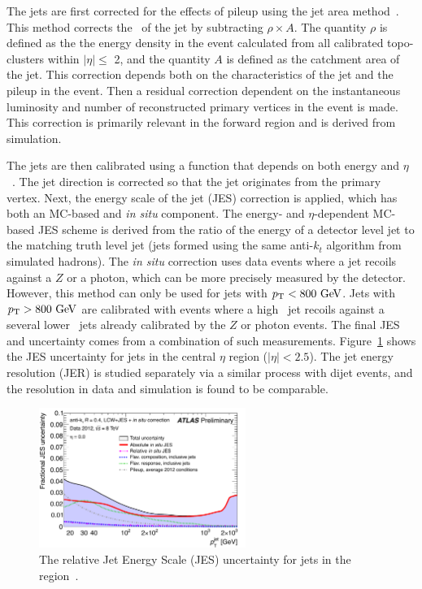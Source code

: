 The jets are first corrected for the effects of pileup using the jet area method~\cite{JES}. This method corrects the \pt\ of the jet by subtracting $\rho\times A$. The quantity $\rho$ is defined as the  the energy density in the event calculated from all calibrated topo-clusters within $|\eta|\leq$ 2, and the quantity $A$ is defined as the catchment area of the jet. This correction depends both on the characteristics of the jet and the pileup in the event. Then a residual correction dependent on the instantaneous luminosity and number of reconstructed primary vertices in the event is made. This correction is primarily relevant in the forward region and is derived from simulation.

The jets are then calibrated using a function that depends on both energy and $\eta$~\cite{JES}. The jet direction is corrected so that the jet originates from the primary vertex. Next, the energy scale of the jet (JES) correction is applied, which has both an MC-based and \emph{in situ} component. The energy- and $\eta$-dependent MC-based JES scheme is derived from the ratio of the energy of a detector level jet to the matching truth level jet (jets formed using the same anti-$k_t$ algorithm from simulated hadrons). The \emph{in situ} correction uses data events where a jet recoils against a $Z$ or a photon, which can be more precisely measured by the detector. However, this method can only be used for jets with $\pt<800 \gev$. Jets with $\pt>800 \gev$ are calibrated with events where a high \pt\ jet recoils against a several lower \pt\ jets already calibrated by the $Z$ or photon events. The final JES and uncertainty comes from a combination of such measurements. Figure~\ref{fig:jesex} shows the JES uncertainty for jets in the central $\eta$ region ($|\eta|<2.5$). The jet energy resolution (JER) is studied separately via a similar process with dijet events, and the resolution in data and simulation is found to be comparable.

\begin{figure}[hp]
\centering
\includegraphics[width=0.6\textwidth]{fig/obj/smalljesunc.pdf}
\caption{The relative Jet Energy Scale (JES) uncertainty for jets in the region~\cite{JES}.}
\label{fig:jesex}
\end{figure}

